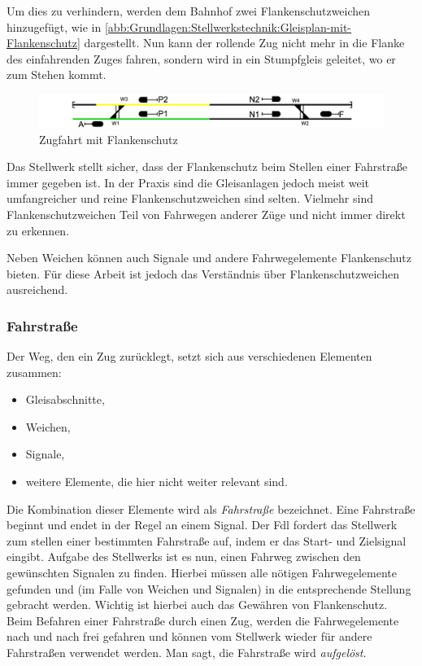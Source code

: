 Um dies zu verhindern, werden dem Bahnhof zwei Flankenschutzweichen hinzugefügt, wie in \autoref{abb:Grundlagen:Stellwerkstechnik:Gleisplan-mit-Flankenschutz} dargestellt. Nun kann der rollende Zug nicht mehr in die Flanke des einfahrenden Zuges fahren, sondern wird in ein Stumpfgleis geleitet, wo er zum Stehen kommt.

\begin{figure}[H]
    \centering
    \includegraphics[width=\textwidth]{Assets/Images/2-Grundlagen/Gleisplan-Einfacher-Bahnhof-Mit-Flankenschutz.png}
    \caption{Zugfahrt mit Flankenschutz}\label{abb:Grundlagen:Stellwerkstechnik:Gleisplan-mit-Flankenschutz}
\end{figure}

Das Stellwerk stellt sicher, dass der Flankenschutz beim Stellen einer Fahrstraße immer gegeben ist. In der Praxis sind die Gleisanlagen jedoch meist weit umfangreicher und reine Flankenschutzweichen sind selten. Vielmehr sind Flankenschutzweichen Teil von Fahrwegen anderer Züge und nicht immer direkt zu erkennen.

Neben Weichen können auch Signale und andere Fahrwegelemente Flankenschutz bieten. Für diese Arbeit ist jedoch das Verständnis über Flankenschutzweichen ausreichend.

\subsubsection*{Fahrstraße}\label{text:Grundlagen:Stellwerkstechnik:Sicherung-des-Schienenverkehrs:Fahrstrasse}

Der Weg, den ein Zug zurücklegt, setzt sich aus verschiedenen Elementen zusammen:

\begin{itemize}
    \item Gleisabschnitte,
    \item Weichen,
    \item Signale,
    \item weitere Elemente, die hier nicht weiter relevant sind.
\end{itemize}

Die Kombination dieser Elemente wird als \textit{Fahrstraße} bezeichnet. Eine Fahrstraße beginnt und endet in der Regel an einem Signal. Der \ac{Fdl} fordert das Stellwerk zum stellen einer bestimmten Fahrstraße auf, indem er das Start- und Zielsignal eingibt. Aufgabe des Stellwerks ist es nun, einen Fahrweg zwischen den gewünschten Signalen zu finden. Hierbei müssen alle nötigen Fahrwegelemente gefunden und (im Falle von Weichen und Signalen) in die entsprechende Stellung gebracht werden. Wichtig ist hierbei auch das Gewähren von Flankenschutz. Beim Befahren einer Fahrstraße durch einen Zug, werden die Fahrwegelemente nach und nach frei gefahren und können vom Stellwerk wieder für andere Fahrstraßen verwendet werden. Man sagt, die Fahrstraße wird \textit{aufgelöst}.~\cite[][S.116 ff.]{bib:Sicherung-des-Schienenverkehrs}

